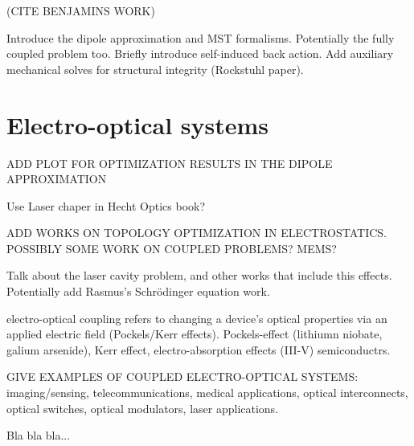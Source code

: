(CITE BENJAMINS WORK)

Introduce the dipole approximation and MST formalisms. Potentially the fully coupled problem too.
Briefly introduce self-induced back action.
Add auxiliary mechanical solves for structural integrity (Rockstuhl paper).

\section{Electro-optical systems~\cite{ownpub4}}

ADD PLOT FOR OPTIMIZATION RESULTS IN THE DIPOLE APPROXIMATION

Use Laser chaper in Hecht Optics book?



ADD WORKS ON TOPOLOGY OPTIMIZATION IN ELECTROSTATICS. POSSIBLY SOME WORK
ON COUPLED PROBLEMS? MEMS?

Talk about the laser cavity problem, and other works that include this effects.
Potentially add Rasmus's Schrödinger equation work.

electro-optical coupling refers to changing a device’s optical properties via an applied electric field (Pockels/Kerr effects). Pockels-effect (lithiumn niobate, galium arsenide), Kerr effect, electro-absorption effects (III-V) semiconductrs.


GIVE EXAMPLES OF COUPLED ELECTRO-OPTICAL SYSTEMS: imaging/sensing, telecommunications,
medical applications, optical interconnects, optical switches, optical modulators,
laser applications.

Bla bla bla...